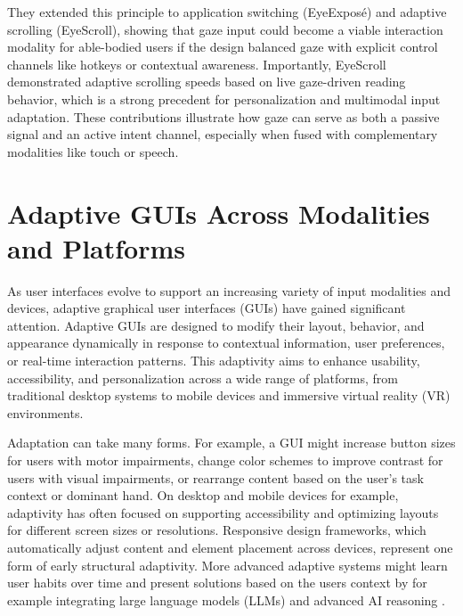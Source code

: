 \documentclass[openany]{book}
\begin{document}
They extended this principle to application switching (EyeExposé) and adaptive scrolling (EyeScroll), showing that gaze input could become a viable interaction modality for able-bodied users if the design balanced gaze with explicit control channels like hotkeys or contextual awareness. Importantly, EyeScroll demonstrated adaptive scrolling speeds based on live gaze-driven reading behavior, which is a strong precedent for personalization and multimodal input adaptation. These contributions illustrate how gaze can serve as both a passive signal and an active intent channel, especially when fused with complementary modalities like touch or speech.

\section{Adaptive GUIs Across Modalities and Platforms}
As user interfaces evolve to support an increasing variety of input modalities and devices, adaptive graphical user interfaces (GUIs) have gained significant attention. Adaptive GUIs are designed to modify their layout, behavior, and appearance dynamically in response to contextual information, user preferences, or real-time interaction patterns. This adaptivity aims to enhance usability, accessibility, and personalization across a wide range of platforms, from traditional desktop systems to mobile devices and immersive virtual reality (VR) environments.

Adaptation can take many forms. For example, a GUI might increase button sizes for users with motor impairments, change color schemes to improve contrast for users with visual impairments, or rearrange content based on the user's task context or dominant hand. On desktop and mobile devices for example, adaptivity has often focused on supporting accessibility and optimizing layouts for different screen sizes or resolutions. Responsive design frameworks, which automatically adjust content and element placement across devices, represent one form of early structural adaptivity. More advanced adaptive systems might learn user habits over time and present solutions based on the users context by for example integrating large language models (LLMs) and advanced AI reasoning \cite{Gajos2008SUPPLE}.

\end{document}
